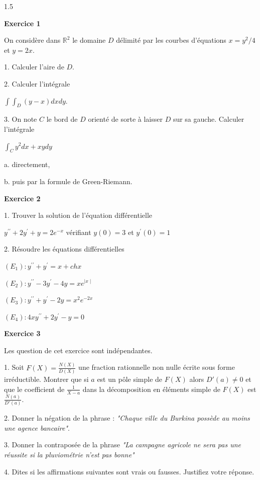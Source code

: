 \documentclass[12pt]{article}
\begin{document}
\begin{spacing}{1.5}

 
 
 \medskip\textbf{Exercice 1}

On considère dans $\mathbb{R}^2$ le domaine $D$ délimité par les courbes d'équations $x = y^2/4$ et $y = 2x$.
 
 1. Calculer l'aire de $D$.
 
 2. Calculer l'intégrale

$\int\int_D(y-x)dxdy$.

3. On note $C$ le bord de $D$ orienté de sorte à laisser $D$ sur sa gauche. Calculer l'intégrale

$\int_Cy^2dx+xydy$

a. directement,

b. puis par la formule de Green-Riemann.


\medskip\textbf{Exercice 2}

1. Trouver la solution de l'équation différentielle

$y^{\prime\prime}+2y^{\prime}+y=2e^{-x}$ vérifiant $y(0)=3$ et $y^{\prime}(0)=1$

2. Résoudre les équations différentielles 

$(E_1): y^{\prime\prime}+y^{\prime}=x+chx$

$(E_2): y^{\prime\prime}-3y^{\prime}-4y=xe^{\mid x\mid}$

$(E_3): y^{\prime\prime}+y^{\prime}-2y=x^2e^{-2x}$

$(E_4): 4xy^{\prime\prime}+2y^{\prime}-y=0$


\medskip\textbf{Exercice 3}

Les question de cet exercice sont indépendantes.

1. Soit $F(X)=\frac{N(X)}{D(X)}$ une fraction rationnelle non nulle écrite sous forme irréductible. Montrer que si $a$ est un pôle simple de $F(X)$ alors $D'(a)\neq 0$ et que le coefficient de $\frac{1}{X-a}$ dans la décomposition en éléments simple de $F(X)$ est $\frac{N(a)}{D'(a)}$.

2. Donner la négation de la phrase : \emph{"Chaque ville du Burkina possède au moins une agence bancaire"}.

3. Donner la contraposée de la phrase \emph{"La campagne agricole ne sera pas une réussite si la pluviométrie n'est pas bonne"}

4. Dites si les affirmations suivantes sont vrais ou fausses. Justifiez votre réponse.


\end{spacing}
\end{document}
